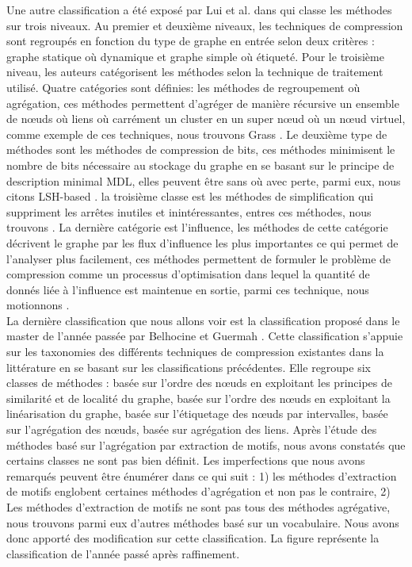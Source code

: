 Une autre classification a été exposé par Lui et al. dans \citep{liu2018graph} qui classe les méthodes sur trois niveaux. Au premier et deuxième niveaux, les techniques de compression sont regroupés en fonction du type de graphe en entrée selon deux critères : graphe statique où dynamique et graphe simple où étiqueté. Pour le troisième niveau, les auteurs catégorisent les méthodes selon la technique de traitement utilisé. Quatre catégories sont définies: les méthodes de regroupement où agrégation, ces méthodes permettent d'agréger de manière récursive un ensemble de nœuds où liens où carrément un cluster en un super nœud où un nœud virtuel, comme exemple de ces techniques, nous trouvons Grass \citep{lefevre2010grass}. Le deuxième type de méthodes sont les méthodes de compression de bits, ces méthodes minimisent le nombre de bits nécessaire au stockage du graphe en se basant sur le principe de description minimal MDL, elles peuvent être sans où avec perte, parmi eux, nous citons LSH-based \citep{khan2014set}. la troisième classe est les méthodes de simplification qui suppriment les arrêtes inutiles et inintéressantes, entres ces méthodes, nous trouvons \citep{shen2006visual}. La dernière catégorie est l'influence, les méthodes de cette catégorie décrivent le graphe par les flux d'influence les plus importantes ce qui permet de l'analyser plus facilement, ces méthodes permettent de formuler le problème de compression comme un processus d'optimisation dans lequel la quantité de donnés liée à l'influence est maintenue en sortie, parmi ces technique, nous motionnons \citep{shi2015vegas}.\\


La dernière classification que nous allons voir est la classification proposé dans le master de l'année passée par Belhocine et Guermah \citep{master2017}. Cette classification s'appuie sur les taxonomies des différents techniques de compression existantes dans la littérature en se basant sur les classifications précédentes. Elle regroupe six classes de méthodes :  basée sur l'ordre des nœuds en exploitant les principes de similarité et de localité du graphe, basée sur l'ordre des nœuds en exploitant la linéarisation du graphe, basée sur l'étiquetage des nœuds par intervalles, basée sur l'agrégation des nœuds, basée sur agrégation des liens. Après l'étude des méthodes basé sur l'agrégation par extraction de motifs, nous avons constatés que certains classes ne sont pas bien définit. Les imperfections que nous avons remarqués peuvent être énumérer dans ce qui suit : 1) les méthodes d'extraction de motifs englobent certaines méthodes d'agrégation et non pas le contraire, 2) Les méthodes d'extraction de motifs ne sont pas tous des méthodes agrégative, nous trouvons parmi eux d'autres méthodes basé sur un vocabulaire. Nous avons donc apporté des modification sur cette classification. La figure représente la classification de l'année passé après raffinement.
 



